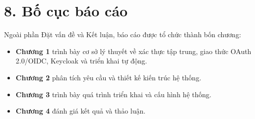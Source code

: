 \section*{8. Bố cục báo cáo}

Ngoài phần Đặt vấn đề và Kết luận, báo cáo được tổ chức thành bốn chương:
\begin{itemize}
  \item \textbf{Chương 1} trình bày cơ sở lý thuyết về xác thực tập trung,
  giao thức OAuth 2.0/OIDC, Keycloak và triển khai tự động.
  \item \textbf{Chương 2} phân tích yêu cầu và thiết kế kiến trúc hệ thống.
  \item \textbf{Chương 3} trình bày quá trình triển khai và cấu hình hệ thống.
  \item \textbf{Chương 4} đánh giá kết quả và thảo luận.
\end{itemize}
